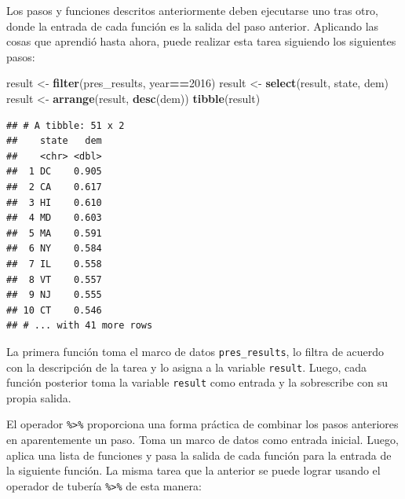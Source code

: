 \documentclass[
]{book}
\newenvironment{Shaded}{\begin{snugshade}}{\end{snugshade}}
\newcommand{\DecValTok}[1]{\textcolor[rgb]{0.00,0.00,0.81}{#1}}
\newcommand{\KeywordTok}[1]{\textcolor[rgb]{0.13,0.29,0.53}{\textbf{#1}}}
\newcommand{\NormalTok}[1]{#1}
\newcommand{\OperatorTok}[1]{\textcolor[rgb]{0.81,0.36,0.00}{\textbf{#1}}}
\newcommand{\StringTok}[1]{\textcolor[rgb]{0.31,0.60,0.02}{#1}}
\begin{document}
Los pasos y funciones descritos anteriormente deben ejecutarse uno tras otro, donde la entrada de cada función es la salida del paso anterior. Aplicando las cosas que aprendió hasta ahora, puede realizar esta tarea siguiendo los siguientes pasos:

\begin{Shaded}
\begin{Highlighting}[]
\NormalTok{result <-}\StringTok{ }\KeywordTok{filter}\NormalTok{(pres_results, year}\OperatorTok{==}\DecValTok{2016}\NormalTok{)}
\NormalTok{result <-}\StringTok{ }\KeywordTok{select}\NormalTok{(result, state, dem)}
\NormalTok{result <-}\StringTok{ }\KeywordTok{arrange}\NormalTok{(result, }\KeywordTok{desc}\NormalTok{(dem))}
\KeywordTok{tibble}\NormalTok{(result)}
\end{Highlighting}
\end{Shaded}

\begin{verbatim}
## # A tibble: 51 x 2
##    state   dem
##    <chr> <dbl>
##  1 DC    0.905
##  2 CA    0.617
##  3 HI    0.610
##  4 MD    0.603
##  5 MA    0.591
##  6 NY    0.584
##  7 IL    0.558
##  8 VT    0.557
##  9 NJ    0.555
## 10 CT    0.546
## # ... with 41 more rows
\end{verbatim}

La primera función toma el marco de datos \texttt{pres\_results}, lo filtra de acuerdo con la descripción de la tarea y lo asigna a la variable \texttt{result}. Luego, cada función posterior toma la variable \texttt{result} como entrada y la sobrescribe con su propia salida.

El operador \texttt{\%\textgreater{}\%} proporciona una forma práctica de combinar los pasos anteriores en aparentemente un paso. Toma un marco de datos como entrada inicial. Luego, aplica una lista de funciones y pasa la salida de cada función para la entrada de la siguiente función. La misma tarea que la anterior se puede lograr usando el operador de tubería \texttt{\%\textgreater{}\%} de esta manera:

\begin{Shaded}
\end{Shaded}
\end{document}
